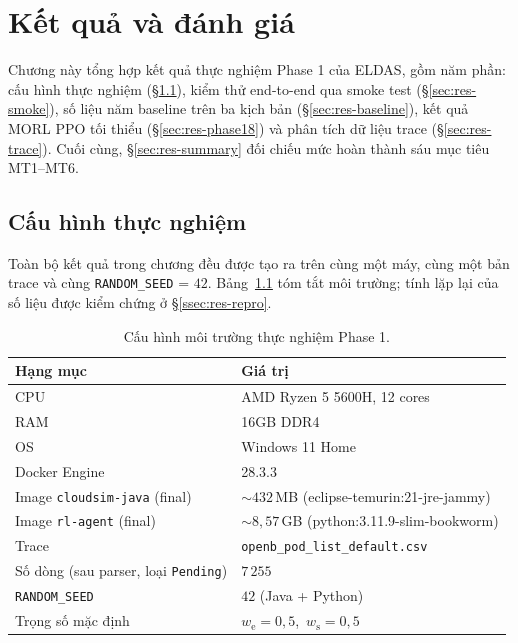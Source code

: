 \chapter{Kết quả và đánh giá}
\label{chap:ket-qua}

Chương này tổng hợp kết quả thực nghiệm Phase 1 của ELDAS, gồm năm
phần: cấu hình thực nghiệm (§\ref{sec:res-env}), kiểm thử end-to-end
qua smoke test (§\ref{sec:res-smoke}), số liệu năm baseline trên ba
kịch bản (§\ref{sec:res-baseline}), kết quả MORL PPO tối thiểu
(§\ref{sec:res-phase18}) và phân tích dữ liệu trace
(§\ref{sec:res-trace}). Cuối cùng, §\ref{sec:res-summary} đối chiếu
mức hoàn thành sáu mục tiêu MT1--MT6.

\section{Cấu hình thực nghiệm}
\label{sec:res-env}

Toàn bộ kết quả trong chương đều được tạo ra trên cùng một máy, cùng
một bản trace và cùng \texttt{RANDOM\_SEED} = $42$.
Bảng~\ref{tab:test-env} tóm tắt môi trường; tính lặp lại của số liệu
được kiểm chứng ở §\ref{ssec:res-repro}.

\begin{table}[H]
  \centering
  \caption{Cấu hình môi trường thực nghiệm Phase 1.}
  \label{tab:test-env}
  \footnotesize
  \begin{tabularx}{\linewidth}{l X}
    \toprule
    \textbf{Hạng mục} & \textbf{Giá trị} \\
    \midrule
    CPU                       & AMD Ryzen 5 5600H, 12 cores \\
    RAM                       & 16GB DDR4 \\
    OS                        & Windows 11 Home \\
    Docker Engine             & 28.3.3\\
    Image \texttt{cloudsim-java} (final) & $\sim 432$\,MB
                                            (eclipse-temurin:21-jre-jammy) \\
    Image \texttt{rl-agent}    (final)   & $\sim 8{,}57$\,GB
                                            (python:3.11.9-slim-bookworm) \\

    \midrule
    Trace                      & \texttt{openb\_pod\_list\_default.csv} \\
    Số dòng (sau parser, loại \texttt{Pending}) & $7\,255$ \\
    \texttt{RANDOM\_SEED}      & $42$ (Java + Python) \\
    Trọng số mặc định          & $w_{\mathrm{e}} = 0{,}5$,\,
                                 $w_{\mathrm{s}} = 0{,}5$ \\
    \bottomrule
  \end{tabularx}
\end{table}

